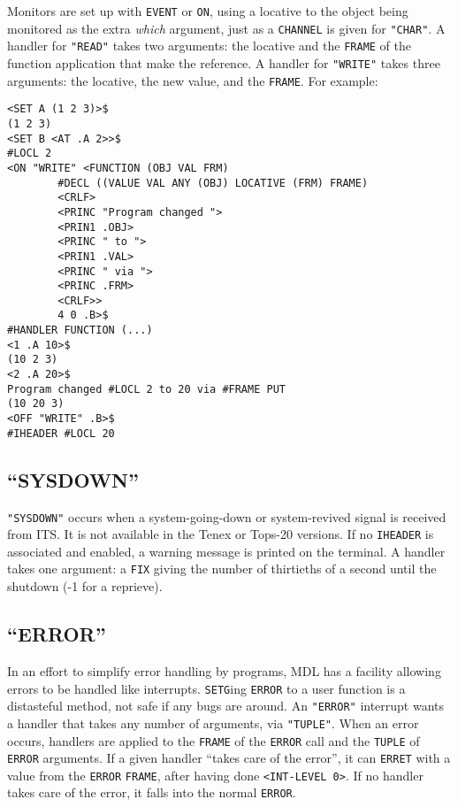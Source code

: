\documentclass[a4paper]{scrbook}
\begin{document}
Monitors are set up with \texttt{EVENT} or \texttt{ON}, using a locative to the object being monitored as the extra
\emph{which} argument, just as a \texttt{CHANNEL} is given for \texttt{"CHAR"}. A handler for \texttt{"READ"} takes two
arguments: the locative and the \texttt{FRAME} of the function application that make the reference. A handler for
\texttt{"WRITE"} takes three arguments: the locative, the new value, and the \texttt{FRAME}. For example:

\begin{verbatim}
<SET A (1 2 3)>$
(1 2 3)
<SET B <AT .A 2>>$
#LOCL 2
<ON "WRITE" <FUNCTION (OBJ VAL FRM)
        #DECL ((VALUE VAL ANY (OBJ) LOCATIVE (FRM) FRAME)
        <CRLF>
        <PRINC "Program changed ">
        <PRIN1 .OBJ>
        <PRINC " to ">
        <PRIN1 .VAL>
        <PRINC " via ">
        <PRINC .FRM>
        <CRLF>>
        4 0 .B>$
#HANDLER FUNCTION (...)
<1 .A 10>$
(10 2 3)
<2 .A 20>$
Program changed #LOCL 2 to 20 via #FRAME PUT
(10 20 3)
<OFF "WRITE" .B>$
#IHEADER #LOCL 20
\end{verbatim}

\subsection{\texorpdfstring{``SYSDOWN''}{21.8.10. SYSDOWN}}\label{sysdown}

\texttt{"SYSDOWN"}  occurs when a system-going-down or system-revived signal is received
from ITS. It is not available in the Tenex or Tops-20
versions. If no \texttt{IHEADER} is associated and enabled, a warning message is printed on the terminal. A handler takes
one argument: a \texttt{FIX} giving the number of thirtieths of a second until the shutdown (-1 for a reprieve).

\subsection{\texorpdfstring{``ERROR''}{21.8.11. ERROR}}\label{error-1}

 In an effort to simplify error handling by programs, MDL has a facility allowing errors
to be handled like interrupts. \texttt{SETG}ing \texttt{ERROR} to a user function is a distasteful method, not safe if any
bugs are around. An \texttt{"ERROR"} interrupt wants a handler that takes any number of arguments, via \texttt{"TUPLE"}.
When an error occurs, handlers are applied to the \texttt{FRAME} of the \texttt{ERROR} call and the \texttt{TUPLE} of
\texttt{ERROR} arguments. If a given handler ``takes care of the error'', it can \texttt{ERRET} with a value from the
\texttt{ERROR} \texttt{FRAME}, after having done \texttt{\textless{}INT-LEVEL\ 0\textgreater{}}. If no handler takes care
of the error, it falls into the normal \texttt{ERROR}.
\end{document}
